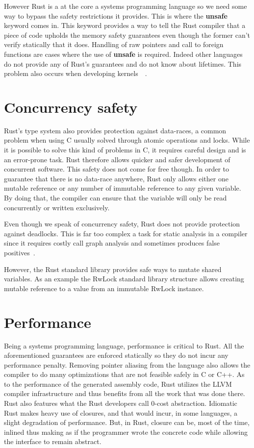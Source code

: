 \documentclass[11pt]{book}
\begin{document}
However Rust is a at the core a systems programming language so we
need some way to bypass the safety restrictions it provides. This is
where the \textbf{unsafe}~\cite{rustonomicon} keyword comes in. This
keyword provides a way to tell the Rust compiler that a piece of code
upholds the memory safety guarantees even though the former can't
verify  statically that it does. Handling of raw pointers and call to
foreign functions are cases where the use of \textbf{unsafe} is
required. Indeed other languages do not provide any of Rust's
guarantees and do not know about lifetimes. This problem also occurs
when developing kernels~\cite{rust-os}~\cite{redox}.

\section{Concurrency safety}

Rust's type system also provides protection against data-races, a
common problem when using C usually solved through atomic operations
and locks. While it is possible to solve this kind of problems in C,
it requires careful design and is an error-prone task. Rust therefore
allows quicker and safer development of concurrent software. This safety
does not come for free though. In order to guarantee that there is no
data-race anywhere, Rust only allows either one mutable reference or
any number of immutable reference to any given variable. By doing
that, the compiler can ensure that the variable will only be read
concurrently or written exclusively.

Even though we speak of concurrency safety, Rust does not provide
protection against deadlocks. This is far too complex a task for
static analysis in a compiler since it requires costly call graph
analysis and sometimes produces false
positives~\cite{deadlock-detection}.

However, the Rust standard library provides safe ways to mutate shared
variables. As an example the RwLock standard library structure allows
creating mutable reference to a value from an immutable RwLock instance.

\section{Performance}

Being a systems programming language, performance is critical to
Rust. All the aforementioned guarantees are enforced statically so
they do not incur any performance penalty. Removing pointer aliasing
from the language also allows the compiler to do many optimizations
that are not feasible safely in C or C++. As to the performance of the
generated assembly code, Rust utilizes the LLVM compiler
infrastructure and thus benefits from all the work that was done
there. Rust also features what the Rust developers call 0-cost
abstraction. Idiomatic Rust makes heavy use of closures, and that
would incur, in some languages, a slight degradation of
performance. But, in Rust, closure can be, most of the time, inlined
thus making as if the programmer wrote the concrete code while
allowing the interface to remain abstract.
\end{document}

